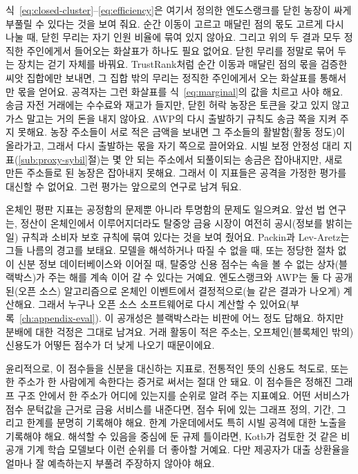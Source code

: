 식~\eqref{eq:closed-cluster}--\eqref{eq:efficiency}은 여기서 정의한 엔도스랭크를 닫힌 농장이 싸게 부풀릴 수 있다는 것을 보여 줘요. 순간 이동이 고르고 매달린 점의 몫도 고르게 다시 나눌 때, 닫힌 무리는 자기 인원 비율에 묶여 있지 않아요. 그리고 위의 두 결과 모두 정직한 주인에게서 들어오는 화살표가 하나도 필요 없어요. 닫힌 무리를 정말로 묶어 두는 장치는 걷기 자체를 바꿔요. TrustRank처럼 순간 이동과 매달린 점의 몫을 검증한 씨앗 집합에만 보내면, 그 집합 밖의 무리는 정직한 주인에게서 오는 화살표를 통해서만 몫을 얻어요. 공격자는 그런 화살표를 식~\eqref{eq:marginal}의 값을 치르고 사야 해요. 송금 자전 거래에는 수수료와 재고가 들지만, 닫힌 허락 농장은 토큰을 갖고 있지 않고 가스 말고는 거의 돈을 내지 않아요. AWP의 다시 출발하기 규칙도 송금 쪽을 지켜 주지 못해요. 농장 주소들이 서로 적은 금액을 보내면 그 주소들의 활발함(활동 정도)이 올라가고, 그래서 다시 출발하는 몫을 자기 쪽으로 끌어와요. 시빌 보정 안정성 대리 지표(\ref{sub:proxy-sybil}절)는 몇 안 되는 주소에서 되풀이되는 송금은 잡아내지만, 새로 만든 주소들로 된 농장은 잡아내지 못해요. 그래서 이 지표들은 공격을 가정한 평가를 대신할 수 없어요. 그런 평가는 앞으로의 연구로 남겨 둬요.


온체인 평판 지표는 공정함의 문제뿐 아니라 투명함의 문제도 일으켜요. 앞선 법 연구는, 정산이 온체인에서 이루어지더라도 탈중앙 금융 시장이 여전히 공시(정보를 밝히는 일) 규칙과 소비자 보호 규칙에 묶여 있다는 것을 보여 줬어요. Packin과 Lev-Aretz는 그들 나름의 경고를 보태요. 모델을 해석하거나 따질 수 없을 때, 또는 정당한 절차 없이 신분 정보 데이터베이스와 이어질 때, 탈중앙 신용 점수는 속을 볼 수 없는 상자(블랙박스)가 주는 해를 계속 이어 갈 수 있다는 거예요. 엔도스랭크와 AWP는 둘 다 공개된(오픈 소스) 알고리즘으로 온체인 이벤트에서 결정적으로(늘 같은 결과가 나오게) 계산해요. 그래서 누구나 오픈 소스 소프트웨어로 다시 계산할 수 있어요(부록~\ref{ch:appendix-eval}). 이 공개성은 블랙박스라는 비판에 어느 정도 답해요. 하지만 분배에 대한 걱정은 그대로 남겨요. 거래 활동이 적은 주소는, 오프체인(블록체인 밖의) 신용도가 어떻든 점수가 더 낮게 나오기 때문이에요.

윤리적으로, 이 점수들을 신분을 대신하는 지표로, 전통적인 뜻의 신용도 척도로, 또는 한 주소가 한 사람에게 속한다는 증거로 써서는 절대 안 돼요. 이 점수들은 정해진 그래프 구조 안에서 한 주소가 어디에 있는지를 순위로 알려 주는 지표예요. 어떤 서비스가 점수 문턱값을 근거로 금융 서비스를 내준다면, 점수 뒤에 있는 그래프 정의, 기간, 그리고 한계를 분명히 기록해야 해요. 한계 가운데에서도 특히 시빌 공격에 대한 노출을 기록해야 해요. 해석할 수 있음을 중심에 둔 규제 틀이라면, Kotb가 검토한 것 같은 비공개 기계 학습 모델보다 이런 순위를 더 좋아할 거예요. 다만 제공자가 대출 상환율을 얼마나 잘 예측하는지 부풀려 주장하지 않아야 해요.

